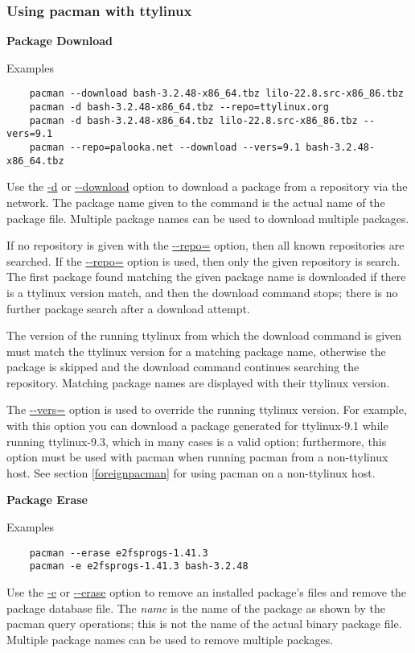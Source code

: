 \documentclass[10pt]{article}
\begin{document}
\subsubsection{Using pacman with ttylinux}

{\bf Package Download}

Examples
\begin{lstlisting}
	pacman --download bash-3.2.48-x86_64.tbz lilo-22.8.src-x86_86.tbz
	pacman -d bash-3.2.48-x86_64.tbz --repo=ttylinux.org
	pacman -d bash-3.2.48-x86_64.tbz lilo-22.8.src-x86_86.tbz --vers=9.1
	pacman --repo=palooka.net --download --vers=9.1 bash-3.2.48-x86_64.tbz
\end{lstlisting}

Use the \url{-d} or \url{--download} option to download a package from a
repository via the network. The package name given to the command is the actual
name of the package file. Multiple package names can be used to download
multiple packages.

If no repository is given with the \url{--repo=} option, then all known
repositories are searched. If the \url{--repo=} option is used, then only the
given repository is search. The first package found matching the given package
name is downloaded if there is a ttylinux version match, and then the download
command stops; there is no further package search after a download attempt.

The version of the running ttylinux from which the download command is given
must match the ttylinux version for a matching package name, otherwise the
package is skipped and the download command continues searching the repository.
Matching package names are displayed with their ttylinux version.

The \url{--vers=} option is used to override the running ttylinux version. For
example, with this option you can download a package generated for ttylinux-9.1
while running ttylinux-9.3, which in many cases is a valid option; furthermore,
this option must be used with pacman when running pacman from a non-ttylinux
host. See section \ref{foreignpacman} for using pacman on a non-ttylinux host.

{\bf Package Erase}

Examples
\begin{lstlisting}
	pacman --erase e2fsprogs-1.41.3
	pacman -e e2fsprogs-1.41.3 bash-3.2.48
\end{lstlisting}

Use the \url{-e} or \url{--erase} option to remove an installed package's files
and remove the package database file. The {\it name} is the name of the package
as shown by the pacman query operations; this is not the name of the actual
binary package file.  Multiple package names can be used to remove multiple
packages.
\end{document}
